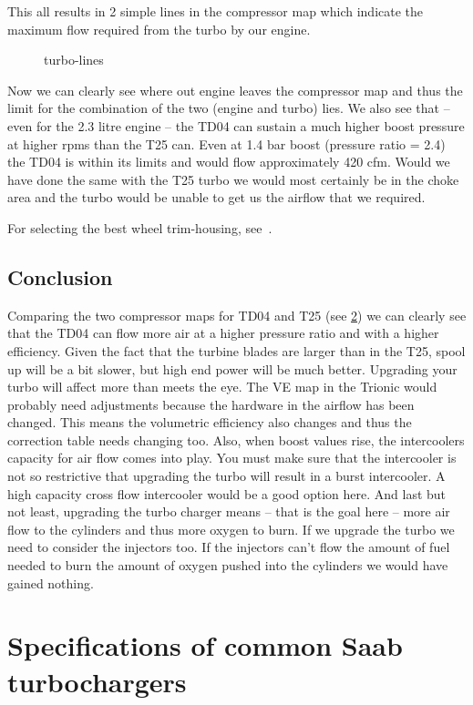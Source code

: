 \documentclass[11pt,a4paper]{book}
\newcommand{\Mfig}[1]{%
\begin{figure}
    \centering
    \missingfigure{#1}
    \caption{#1}
\end{figure}}
\begin{document}
This all results in 2 simple lines in the compressor map which indicate the maximum flow required
from the turbo by our engine.
\Mfig{turbo-lines}
Now we can clearly see where out engine leaves the compressor map and thus the limit for the
combination of the two (engine and turbo) lies.
We also see that – even for the 2.3 litre engine – the TD04 can sustain a much higher boost pressure
at higher rpms than the T25 can. Even at 1.4 bar boost (pressure ratio = 2.4) the TD04 is within its
limits and would flow approximately 420 cfm. Would we have done the same with the T25 turbo we
would most certainly be in the choke area and the turbo would be unable to get us the airflow that we
required.

For selecting the best wheel trim-housing, see~\cite{Isaac-Lowry2004}.

\section{Conclusion}
Comparing the two compressor maps for TD04 and T25 (see \cref{chap:turbo-specs})
we can clearly see that the TD04 can flow more air at a higher pressure ratio
and with a higher efficiency. Given the fact that the turbine blades are larger
than in the T25, spool up will be a bit slower, but high end power will be much
better. Upgrading your turbo will affect more than meets the eye. The VE map in
the Trionic would probably need adjustments because the hardware in the airflow
has been changed. This means the volumetric efficiency also changes and thus the
correction table needs changing too. Also, when boost values rise, the
intercoolers capacity for air flow comes into play. You must make sure that the
intercooler is not so restrictive that upgrading the turbo will result in a
burst intercooler. A high capacity cross flow intercooler would be a good option
here. And last but not least, upgrading the turbo charger means – that is the
goal here – more air flow to the cylinders and thus more oxygen to burn. If we
upgrade the turbo we need to consider the injectors too. If the injectors can’t
flow the amount of fuel needed to burn the amount of oxygen pushed into the
cylinders we would have gained nothing.

\chapter{Specifications of common Saab turbochargers}\label{chap:turbo-specs}
\end{document}

